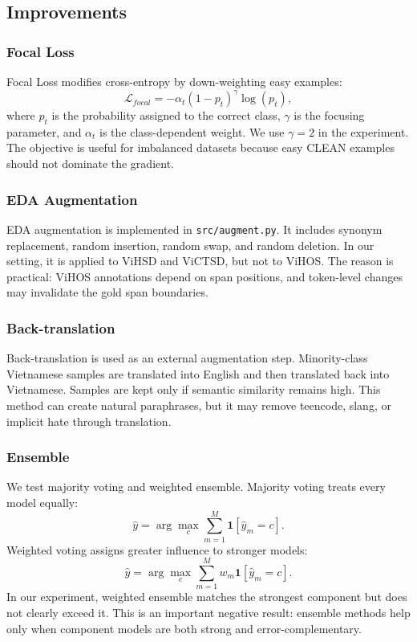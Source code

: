 \documentclass[journal]{IEEEtran}
\begin{document}
\subsection{Improvements}
\subsubsection{Focal Loss}
Focal Loss modifies cross-entropy by down-weighting easy examples:
\begin{equation}
\mathcal{L}_{focal} = -\alpha_t (1-p_t)^\gamma \log(p_t),
\end{equation}
where $p_t$ is the probability assigned to the correct class, $\gamma$ is the focusing parameter, and $\alpha_t$ is the class-dependent weight. We use $\gamma=2$ in the experiment. The objective is useful for imbalanced datasets because easy CLEAN examples should not dominate the gradient.

\subsubsection{EDA Augmentation}
EDA augmentation is implemented in \texttt{src/augment.py}. It includes synonym replacement, random insertion, random swap, and random deletion. In our setting, it is applied to ViHSD and ViCTSD, but not to ViHOS. The reason is practical: ViHOS annotations depend on span positions, and token-level changes may invalidate the gold span boundaries.

\subsubsection{Back-translation}
Back-translation is used as an external augmentation step. Minority-class Vietnamese samples are translated into English and then translated back into Vietnamese. Samples are kept only if semantic similarity remains high. This method can create natural paraphrases, but it may remove teencode, slang, or implicit hate through translation.

\subsubsection{Ensemble}
We test majority voting and weighted ensemble. Majority voting treats every model equally:
\begin{equation}
\hat{y}=\arg\max_c \sum_{m=1}^{M} \mathbf{1}[\hat{y}_m=c].
\end{equation}
Weighted voting assigns greater influence to stronger models:
\begin{equation}
\hat{y}=\arg\max_c \sum_{m=1}^{M} w_m \mathbf{1}[\hat{y}_m=c].
\end{equation}
In our experiment, weighted ensemble matches the strongest component but does not clearly exceed it. This is an important negative result: ensemble methods help only when component models are both strong and error-complementary.
\end{document}
